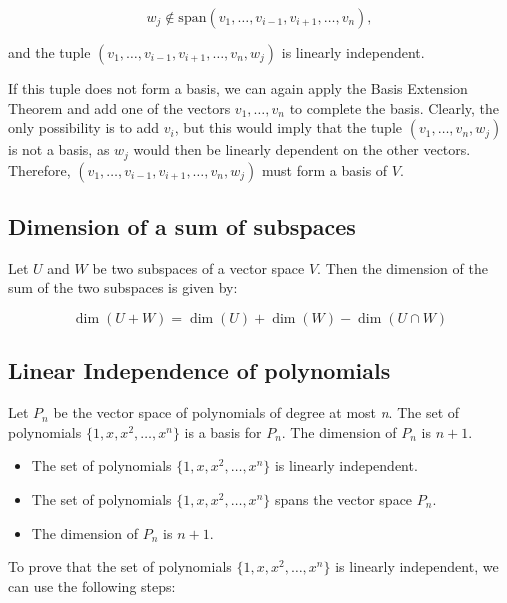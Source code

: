 \[
	w_j \notin \text{span}(v_1, \ldots, v_{i-1}, v_{i+1}, \ldots, v_n),
\]

and the tuple \((v_1, \ldots, v_{i-1}, v_{i+1}, \ldots, v_n, w_j)\) is linearly independent.

If this tuple does not form a basis, we can again apply the Basis Extension Theorem 
and add one of the vectors \(v_1, \ldots, v_n\) to complete the basis. Clearly, the only possibility is 
to add \(v_i\), but this would imply that the tuple \((v_1, \ldots, v_n, w_j)\) is not a basis, as 
\(w_j\) would then be linearly dependent on the other vectors. 
Therefore, \((v_1, \ldots, v_{i-1}, v_{i+1}, \ldots, v_n, w_j)\) must form a basis of \(V\).

\QED

\subsection{Dimension of a sum of subspaces}

Let \(U\) and \(W\) be two subspaces of a vector space \(V\). Then the dimension of the sum of the two 
subspaces is given by:

\[
    \dim(U + W) = \dim(U) + \dim(W) - \dim(U \cap W)    
\]

\subsection{Linear Independence of polynomials}

Let \(P_n\) be the vector space of polynomials of degree at most \emph{n}. The set of polynomials 
\(\{1, x, x^2, \ldots, x^n\}\) is a basis for \(P_n\).
The dimension of \(P_n\) is \(n + 1\).

\begin{itemize}

	\item The set of polynomials \(\{1, x, x^2, \ldots, x^n\}\) is linearly independent.

	\item The set of polynomials \(\{1, x, x^2, \ldots, x^n\}\) spans the vector space \(P_n\).

	\item The dimension of \(P_n\) is \(n + 1\).

\end{itemize}

To prove that the set of polynomials \(\{1, x, x^2, \ldots, x^n\}\) is linearly independent, 
we can use the following steps:

